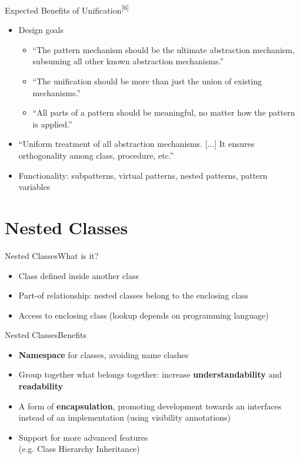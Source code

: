 \documentclass[xcolor=dvipsname,handout]{beamer} %
\begin{document}
\begin{frame}{Expected Benefits of Unification\textsuperscript{[6]}}
\begin{itemize}
  \item Design goals \begin{itemize}
    \item ``The pattern mechanism should be the ultimate abstraction mechanism, subsuming all other known abstraction mechanisms.'' 
    \item ``The unification should be more than just the union of existing mechanisms.''
    \item ``All parts of a pattern should be meaningful, no matter how the pattern is applied.''
  \end{itemize}
  \item ``Uniform treatment of all abstraction mechanisms. [...] It ensures orthogonality among class, procedure, etc.''
  \item Functionality: subpatterns, virtual patterns, nested patterns, pattern variables
\end{itemize}
\end{frame}

\section{Nested Classes}

\begin{frame}{Nested Classes}{What is it?}
\begin{itemize}
  \item Class defined inside another class
  \item Part-of relationship: nested classes belong to the enclosing class
  \item Access to enclosing class (lookup depends on programming language)
\end{itemize}
\end{frame}

\begin{frame}{Nested Classes}{Benefits}
\begin{itemize}
  \item \textbf{Namespace} for classes, avoiding name clashes
  \item Group together what belongs together: increase \textbf{understandability} and \textbf{readability}
  \item A form of \textbf{encapsulation}, promoting development towards an interfaces instead of an implementation (using visibility annotations)
  \item Support for more advanced features \\ (e.g. Class Hierarchy Inheritance)
\end{itemize}
\end{frame}
\end{document}
